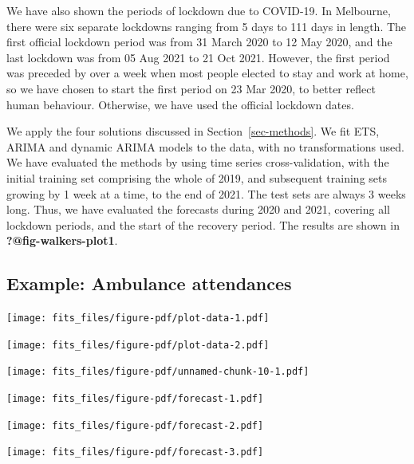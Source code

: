 \documentclass[11pt,a4paper,]{article}
\begin{document}
We have also shown the periods of lockdown due to COVID-19. In
Melbourne, there were six separate lockdowns ranging from 5 days to 111
days in length. The first official lockdown period was from 31 March
2020 to 12 May 2020, and the last lockdown was from 05 Aug 2021 to 21
Oct 2021. However, the first period was preceded by over a week when
most people elected to stay and work at home, so we have chosen to start
the first period on 23 Mar 2020, to better reflect human behaviour.
Otherwise, we have used the official lockdown dates.

We apply the four solutions discussed in Section~\ref{sec-methods}. We
fit ETS, ARIMA and dynamic ARIMA models to the data, with no
transformations used. We have evaluated the methods by using time series
cross-validation, with the initial training set comprising the whole of
2019, and subsequent training sets growing by 1 week at a time, to the
end of 2021. The test sets are always 3 weeks long. Thus, we have
evaluated the forecasts during 2020 and 2021, covering all lockdown
periods, and the start of the recovery period. The results are shown in
\textbf{?@fig-walkers-plot1}.

\subsection{Example: Ambulance
attendances}\label{example-ambulance-attendances}

\texttt{[image: fits\_files/figure-pdf/plot-data-1.pdf]}

\texttt{[image: fits\_files/figure-pdf/plot-data-2.pdf]}

\texttt{[image: fits\_files/figure-pdf/unnamed-chunk-10-1.pdf]}

\texttt{[image: fits\_files/figure-pdf/forecast-1.pdf]}

\texttt{[image: fits\_files/figure-pdf/forecast-2.pdf]}

\texttt{[image: fits\_files/figure-pdf/forecast-3.pdf]}

\printbibliography[title=References]
\end{document}
